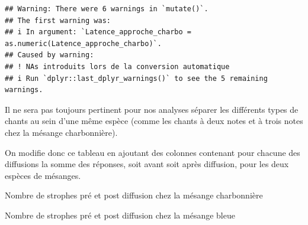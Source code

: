 \documentclass[
  french,
]{article}
\newenvironment{Shaded}{\begin{snugshade}}{\end{snugshade}}
\newcommand{\FunctionTok}[1]{\textcolor[rgb]{0.13,0.29,0.53}{\textbf{#1}}}
\newcommand{\NormalTok}[1]{#1}
\newcommand{\OtherTok}[1]{\textcolor[rgb]{0.56,0.35,0.01}{#1}}
\newcommand{\SpecialCharTok}[1]{\textcolor[rgb]{0.81,0.36,0.00}{\textbf{#1}}}
\begin{document}
\begin{verbatim}
## Warning: There were 6 warnings in `mutate()`.
## The first warning was:
## i In argument: `Latence_approche_charbo = as.numeric(Latence_approche_charbo)`.
## Caused by warning:
## ! NAs introduits lors de la conversion automatique
## i Run `dplyr::last_dplyr_warnings()` to see the 5 remaining warnings.
\end{verbatim}

Il ne sera pas toujours pertinent pour nos analyses séparer les
différents types de chants au sein d'une même espèce (comme les chants à
deux notes et à trois notes chez la mésange charbonnière).

On modifie donc ce tableau en ajoutant des colonnes contenant pour
chacune des diffusions la somme des réponses, soit avant soit après
diffusion, pour les deux espèces de mésanges.

Nombre de strophes pré et post diffusion chez la mésange charbonnière

\begin{Shaded}
\end{Shaded}

Nombre de strophes pré et post diffusion chez la mésange bleue

\begin{Shaded}
\end{Shaded}
\end{document}
